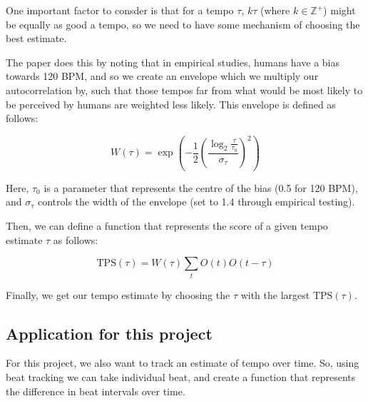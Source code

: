 \documentclass[12pt]{article}
\begin{document}
One important factor to consder is that for a tempo $\tau$, $k\tau$ (where $k \in \mathbb{Z}^+$) might be equally as good a tempo, so we need to have some mechanism of choosing the best estimate.

The paper does this by noting that in empirical studies, humans have a bias towards 120 BPM, and so we create an envelope which we multiply our autocorrelation by, such that those tempos far from what would be most likely to be perceived by humans are weighted less likely. This envelope is defined as follows:

\[
    W(\tau) = \exp\left( -\frac{1}{2}\left(\frac{\log_2 \frac{\tau}{\tau_0}}{\sigma_\tau}\right)^2\right)
\] 

Here, $\tau_0$ is a parameter that represents the centre of the bias (0.5 for 120 BPM), and $\sigma_\tau$ controls the width of the envelope (set to 1.4 through empirical testing).

Then, we can define a function that represents the score of a given tempo estimate $\tau$ as follows:

\[
    \mathrm{TPS}(\tau) = W(\tau) \sum_t O(t)O(t - \tau)
\] 

Finally, we get our tempo estimate by choosing the $\tau$ with the largest $\mathrm{TPS}(\tau)$.

\subsection{Application for this project}

For this project, we also want to track an estimate of tempo over time. So, using beat tracking we can take individual beat, and create a function that represents the difference in beat intervals over time.


















\printbibliography
\end{document}
